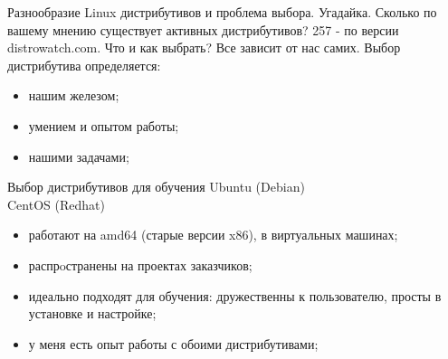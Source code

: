 \begin{frame}{Разнообразие Linux дистрибутивов и проблема выбора.}
    Угадайка. Сколько по вашему мнению существует активных дистрибутивов? 
    \pause
    \alert{257} - по версии distrowatch.com. \break 
    Что и как выбрать? \pause 
    \break
Все зависит от нас самих.  \break
    Выбор дистрибутива определяется:
	\begin{itemize}
            \item нашим железом;
            \item умением и опытом работы;
            \item нашими задачами;
	\end{itemize}
\end{frame}

\begin{frame}{Выбор дистрибутивов для обучения}
    Ubuntu (Debian) \\
    CentOS (Redhat)
	\begin{itemize}
            \item работают на amd64 (старые версии x86), в виртуальных машинах;
            \item распрoстранены на проектах заказчиков;
            \item идеально подходят для обучения: дружественны к пользователю,
            просты в установке и настройке; 
            \item у меня есть опыт работы с обоими дистрибутивами; 
	\end{itemize}
\end{frame}
